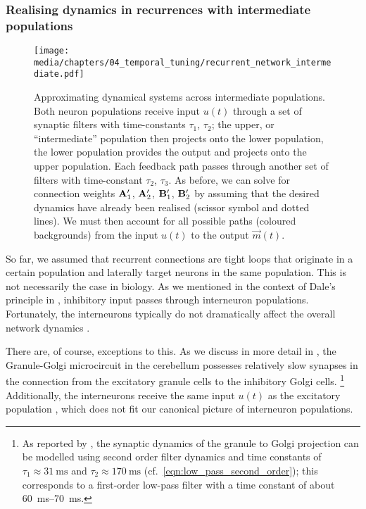 \subsubsection{Realising dynamics in recurrences with intermediate populations}

\begin{figure}
	\texttt{[image: media/chapters/04\_temporal\_tuning/recurrent\_network\_intermediate.pdf]}
	\caption[Approximating dynamical systems across intermediate populations]{Approximating dynamical systems across intermediate populations. Both neuron populations receive input $u(t)$ through a set of synaptic filters with time-constants $\tau_1$, $\tau_2$; the upper, or \enquote{intermediate} population then projects onto the lower population, the lower population provides the output and projects onto the upper population. Each feedback path passes through another set of filters with time-constant $\tau_2$, $\tau_3$.
	As before, we can solve for connection weights $\mathbf{A}_1'$, $\mathbf{A}_2'$, $\mathbf{B}_1'$, $\mathbf{B}_2'$ by assuming that the desired dynamics have already been realised (scissor symbol and dotted lines).
	We must then account for all possible paths (coloured backgrounds) from the input $u(t)$ to the output $\vec m(t)$.
	}
	\label{fig:recurrent_network_intermediate}
\end{figure}

So far, we assumed that recurrent connections are tight loops that originate in a certain population and laterally target neurons in the same population.
This is not necessarily the case in biology.
As we mentioned in the context of Dale's principle in , inhibitory input passes through interneuron populations.
Fortunately, the interneurons typically do not dramatically affect the overall network dynamics \citep{parisien2008solving}.

There are, of course, exceptions to this.
As we discuss in more detail in , the Granule-Golgi microcircuit in the cerebellum possesses relatively slow synapses in the connection from the excitatory granule cells to the inhibitory Golgi cells.%
\footnote{As reported by \citet{dieudonne1998submillisecond}, the synaptic dynamics of the granule to Golgi projection can be modelled using second order filter dynamics and time constants of $\tau_1 \approx \SI{31}{\milli\second}$ and $\tau_2 \approx \SI{170}{\milli\second}$ (cf.~\cref{eqn:low_pass_second_order}); this corresponds to a first-order low-pass filter with a time constant of about \SIrange{60}{70}{\milli\second}.}
Additionally, the interneurons receive the same input $u(t)$ as the excitatory population \citep{dangelo2013cerebellar}, which does not fit our canonical picture of interneuron populations.

